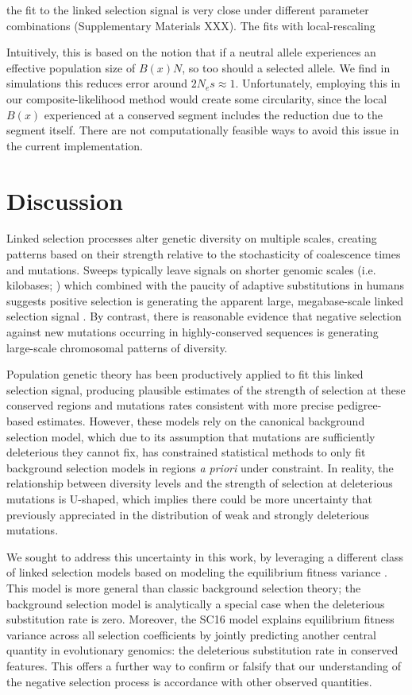 \documentclass[11pt]{article}
\begin{document}
the fit to the linked selection signal is very close under
different parameter combinations (Supplementary Materials XXX). The fits with
local-rescaling 


Intuitively, this is based on the notion that if a neutral allele experiences
an effective population size of $B(x)N$, so too should a selected allele. We
find in simulations this reduces error around $2 N_e s \approx 1$.
Unfortunately, employing this in our composite-likelihood method would create
some circularity, since the local $B(x)$ experienced at a conserved segment
includes the reduction due to the segment itself. There are not computationally
feasible ways to avoid this issue in the current implementation.



\section*{Discussion}

Linked selection processes alter genetic diversity on multiple scales, creating
patterns based on their strength relative to the stochasticity of coalescence
times and mutations. Sweeps typically leave signals on shorter genomic scales
(i.e. kilobases; \cite{Akey2004-zg}) which combined with the paucity of
adaptive substitutions in humans suggests positive selection is generating the
apparent large, megabase-scale linked selection signal
\parencite{Hernandez2011-gs,Murphy2022-sj}. By contrast, there is reasonable
evidence that negative selection against new mutations occurring in
highly-conserved sequences is generating large-scale chromosomal patterns of
diversity. 

Population genetic theory has been productively applied to fit this linked
selection signal, producing plausible estimates of the strength of selection at
these conserved regions and mutations rates consistent with more precise
pedigree-based estimates. However, these models rely on the canonical
background selection model, which due to its assumption that mutations are
sufficiently deleterious they cannot fix, has constrained statistical methods
to only fit background selection models in regions \emph{a priori} under
constraint. In reality, the relationship between diversity levels and the
strength of selection at deleterious mutations is U-shaped, which implies there
could be more uncertainty that previously appreciated in the distribution of
weak and strongly deleterious mutations.

We sought to address this uncertainty in this work, by leveraging a different
class of linked selection models based on modeling the equilibrium fitness
variance \parencite{Santiago2016-mu}. This model is more general than classic
background selection theory; the background selection model is analytically a
special case when the deleterious substitution rate is zero. Moreover, the SC16
model explains equilibrium fitness variance across all selection coefficients
by jointly predicting another central quantity in evolutionary genomics: the
deleterious substitution rate in conserved features. This offers a further way
to confirm or falsify that our understanding of the negative selection process
is accordance with other observed quantities.
\end{document}
